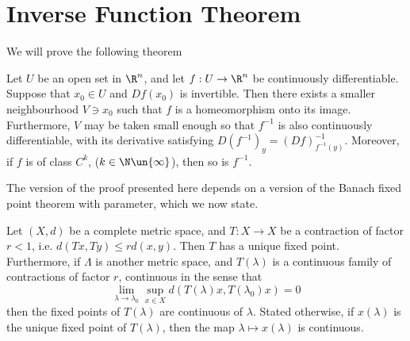 \documentclass[12pt]{article}
\begin{document}
\section{Inverse Function Theorem}
We will prove the following theorem
\begin{thm}Let $U$ be an open set in $\R^n$, and let $f:U \to \R^n$ be continuously differentiable. Suppose that $x_0 \in U$ and $Df(x_0)$ is invertible. Then there exists a smaller neighbourhood $V \ni x_0$ such that $f$ is a homeomorphism onto its image. Furthermore, $V$ may be taken small enough so that $f^{-1}$ is also continuously differentiable, with its derivative satisfying $D(f^{-1})_y = (Df)^{-1}_{f^{-1}(y)}$. Moreover, if $f$ is of class $C^k$, ($k \in \N \un \{\infty\}$), then so is $f^{-1}$.\end{thm}
The version of the proof presented here depends on a version of the Banach fixed point theorem with parameter, which we now state.
\begin{thm}Let $(X,d)$ be a complete metric space, and $T:X \to X$ be a contraction of factor $r < 1$, i.e. $d(Tx,Ty) \leq rd(x,y)$. Then $T$ has a unique fixed point. Furthermore, if $\Lambda$ is another metric space, and $T(\lambda)$ is a continuous family of contractions of factor $r$, continuous in the sense that
\[\lim_{\lambda \to \lambda_0} \sup_{x \in X}d(T(\lambda) x,T(\lambda_0)x) = 0\]
then the fixed points of $T(\lambda)$ are continuous of $\lambda$. Stated otherwise, if $x(\lambda)$ is the unique fixed point of $T(\lambda)$, then the map $\lambda \mapsto x(\lambda)$ is continuous.\end{thm}
\end{document}
